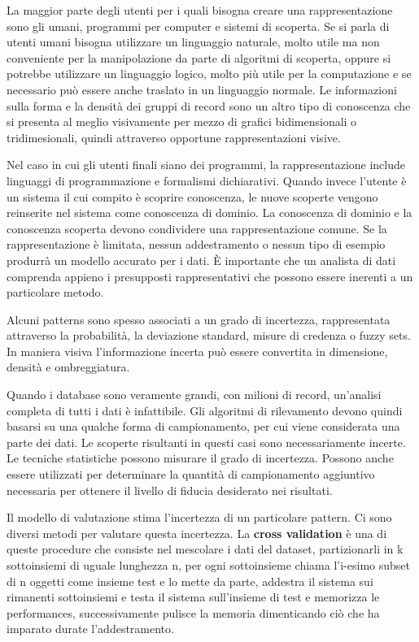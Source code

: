 \documentclass[a4paper]{extarticle}
\begin{document}
La maggior parte degli utenti per i quali bisogna creare una rappresentazione sono gli umani, programmi per computer e sistemi di scoperta. Se si parla di utenti umani bisogna utilizzare un linguaggio naturale, molto utile ma non conveniente per la manipolazione da parte di algoritmi di scoperta, oppure si potrebbe utilizzare un linguaggio logico, molto più utile per la computazione e se necessario può essere anche traslato in un linguaggio normale. Le informazioni sulla forma e la densità dei gruppi di record sono un altro tipo di conoscenza che si presenta al meglio visivamente per mezzo di grafici bidimensionali o tridimesionali, quindi attraverso opportune rappresentazioni visive. 

Nel caso in cui gli utenti finali siano dei programmi, la rappresentazione include linguaggi di programmazione e formalismi dichiarativi. Quando invece l'utente è un sistema il cui compito è scoprire conoscenza, le nuove scoperte vengono reinserite nel sistema come conoscenza di dominio. La conoscenza di dominio e la conoscenza scoperta devono condividere una rappresentazione comune. Se la rappresentazione è limitata, nessun addestramento o nessun tipo di esempio produrrà un modello accurato per i dati. È importante che un analista di dati comprenda appieno i presupposti rappresentativi che possono essere inerenti a un particolare metodo.

Alcuni patterns sono spesso associati a un grado di incertezza, rappresentata attraverso la probabilità, la deviazione standard, misure di credenza o fuzzy sets. In maniera visiva l'informazione incerta può essere convertita in dimensione, densità e ombreggiatura.

Quando i database sono veramente grandi, con milioni di record, un'analisi completa di tutti i dati è infattibile. Gli algoritmi di rilevamento devono quindi basarsi su una qualche forma di campionamento, per cui viene considerata una parte dei dati. Le scoperte risultanti in questi casi sono necessariamente incerte. Le tecniche statistiche possono misurare il grado di incertezza. Possono anche essere utilizzati per determinare la quantità di campionamento aggiuntivo necessaria per ottenere il livello di fiducia desiderato nei risultati.

Il modello di valutazione stima l'incertezza di un particolare pattern. Ci sono diversi metodi per valutare questa incertezza. La \textbf{cross validation} è una di queste procedure che consiste nel mescolare i dati del dataset, partizionarli in k sottoinsiemi di uguale lunghezza n, per ogni sottoinsieme chiama l'i-esimo subset di n oggetti come insieme test e lo mette da parte, addestra il sistema sui rimanenti sottoinsiemi e testa il sistema sull'insieme di test e memorizza le performances,  successivamente pulisce la memoria dimenticando ciò che ha imparato durate l'addestramento.
\end{document}
